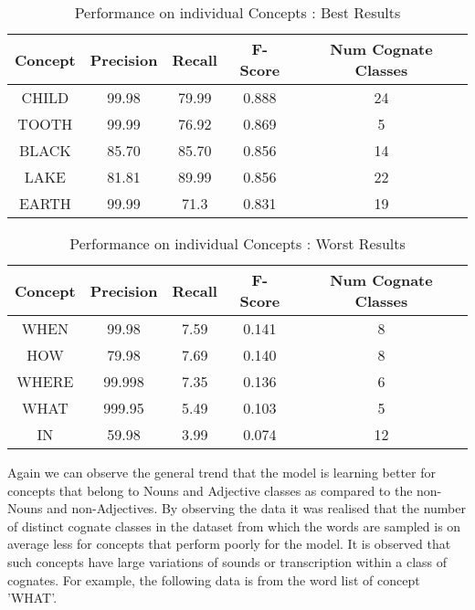 \documentclass[journal]{IEEEtran}
\begin{document}
\begin{table}[h!]
\centering
\caption{Performance on individual Concepts : Best Results}
\begin{tabular}{|c|c|c|c|c|}
\hline
\textbf{Concept} & \textbf{Precision} & \textbf{Recall} & \textbf{F-Score} & \textbf{Num Cognate Classes} \\ \hline
CHILD            & 99.98              & 79.99           & 0.888            & 24                           \\ \hline
TOOTH            & 99.99              & 76.92           & 0.869            & 5                            \\ \hline
BLACK            & 85.70              & 85.70           & 0.856            & 14                           \\ \hline
LAKE             & 81.81              & 89.99           & 0.856            & 22                           \\ \hline
EARTH            & 99.99              & 71.3            & 0.831            & 19                           \\ \hline
\end{tabular}
\end{table}

\begin{table}[h!]
\centering
\caption{Performance on individual Concepts : Worst Results}
\label{my-label}
\begin{tabular}{|c|c|c|c|c|}
\hline
\textbf{Concept} & \textbf{Precision} & \textbf{Recall} & \textbf{F-Score} & \textbf{Num Cognate Classes} \\ \hline
WHEN             & 99.98              & 7.59            & 0.141            & 8                            \\ \hline
HOW              & 79.98              & 7.69            & 0.140            & 8                            \\ \hline
WHERE            & 99.998             & 7.35            & 0.136            & 6                            \\ \hline
WHAT             & 999.95             & 5.49            & 0.103            & 5                            \\ \hline
IN               & 59.98              & 3.99            & 0.074            & 12                           \\ \hline
\end{tabular}
\end{table}

Again we can observe the general trend that the model is learning better for concepts that belong to Nouns and Adjective classes as compared to the non-Nouns and non-Adjectives. By observing the data it was realised that the number of distinct cognate classes in the dataset from which the words are sampled is on average less for concepts that perform poorly for the model. It is observed that such concepts have large variations of sounds or transcription within a class of cognates. For example, the following data is from the word list of concept 'WHAT'.
\end{document}
